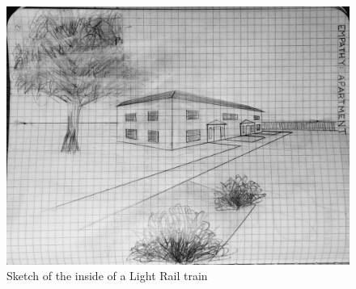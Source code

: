 \documentclass[11pt]{article}
\begin{document}
\begin{figure}[H]
    \centering
    \includegraphics[width=160mm]{resources/apartment.jpg}
    \caption{Sketch of the inside of a Light Rail train}
\end{figure}
\end{document}
